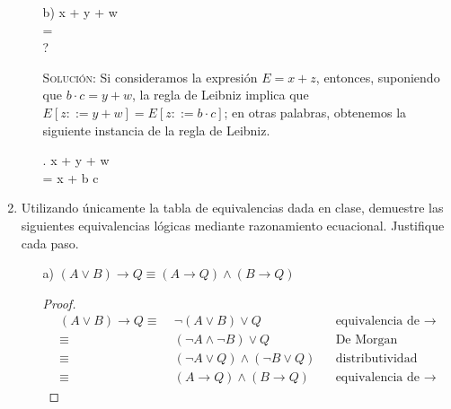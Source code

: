 \documentclass[letterpaper,11pt]{article}
\begin{document}
\begin{enumerate}
\begin{itemize}
        \item[b)] \; 
        {x + y + w \\ = \\ ?}

        \textsc{Solución:} Si consideramos la expresión $E = x + z$, entonces,
        suponiendo que $b \cdot c = y + w$, la regla de Leibniz implica que 
        $E[z ::= y + w] = E[z ::= b \cdot c]$; en otras palabras, obtenemos la 
        siguiente instancia de la regla de Leibniz.
        \item[.] \; 
        {x + y + w \\ = x + b \cdot c}
    \end{itemize}

    \item Utilizando únicamente la tabla de equivalencias dada en clase, 
    demuestre las siguientes equivalencias lógicas mediante razonamiento 
    ecuacional. Justifique cada paso.

    \begin{itemize}
        \item[a)] $(A \lor B) → Q ≡ (A → Q) \land (B → Q)$ 
        \begin{proof}
            \begin{align*}
                (A \lor B) → Q 
                ≡& \; \neg (A \lor B) \lor Q  
                && \text{equivalencia de $→$} \\
                ≡& \; (\neg A \land \neg B) \lor Q 
                && \text{De Morgan} \\ 
                ≡& \; (\neg A \lor Q) \land (\neg B \lor Q)
                && \text{distributividad} \\ 
                ≡& \; (A → Q) \land (B → Q)
                && \text{equivalencia de $→$} 
            \end{align*}
        \end{proof}


\end{itemize}
\end{enumerate}
\end{document}
